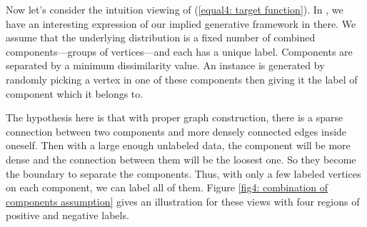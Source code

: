 Now let's consider the intuition viewing of  (\ref{equal4: target function}). In \parencite{Blum:2001:LLU:645530.757779}, we have an interesting expression of our implied generative framework in there. We assume that the underlying distribution is a fixed number of combined components---groups of vertices---and each has a unique label. Components are separated by a minimum dissimilarity value. An instance is generated by randomly picking a vertex in one of these components then giving it the label of component which it belongs to. 

The hypothesis here is that with proper graph construction, there is a sparse connection between two components and more densely connected edges inside oneself. Then with a large enough unlabeled data, the component will be more dense and the connection between them will be the loosest one. So they become the boundary to separate the components. Thus, with only a few labeled vertices on each component, we can label all of them. Figure \ref{fig4: combination of components assumption} gives an illustration for these views with four regions of positive and negative labels.

